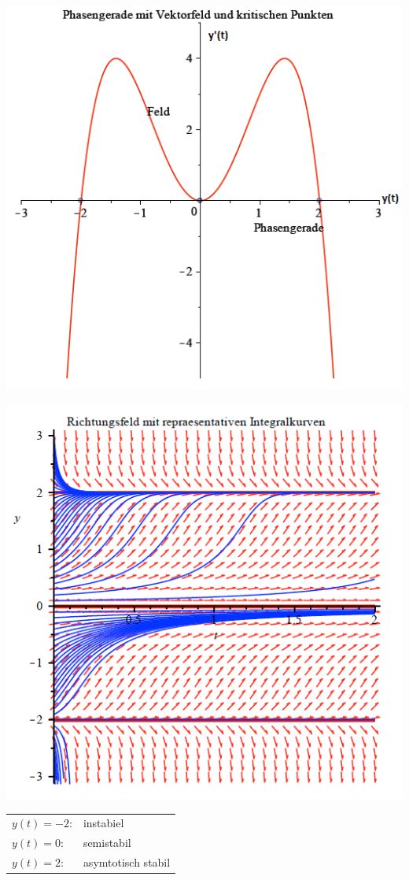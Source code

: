\begin{minipage}[h]{0.35\textwidth} 
	\includegraphics[width=1.0\textwidth]{images/Phasengerade.png}
\end{minipage}
\begin{minipage}[h]{0.35\textwidth}
	\includegraphics[width=1.0\textwidth]{images/Richtungsfeld.png}
\end{minipage}
\begin{tabular}{p{1.8cm}p{5cm}}
	$y(t) = -2$: & instabiel \\
	$y(t) = 0$: & semistabil\\
	$y(t) = 2$: & asymtotisch stabil\\
\end{tabular}
